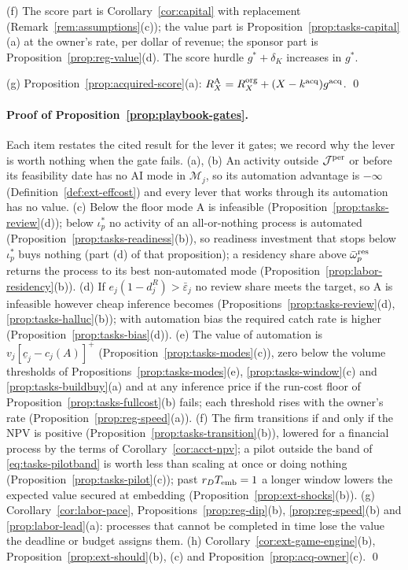 (f) The score part is Corollary~\ref{cor:capital} with replacement (Remark~\ref{rem:assumptions}(c)); the value part is Proposition~\ref{prop:tasks-capital}(a) at the owner's rate, per dollar of revenue; the sponsor part is Proposition~\ref{prop:reg-value}(d). The score hurdle $g^*+\delta_K$ increases in $g^*$.

(g) Proposition~\ref{prop:acquired-score}(a): $R^{\rm A}_X=R^{\rm org}_X+(X-k^{\rm acq})g^{\rm acq}$. \qed

\paragraph{Proof of Proposition~\ref{prop:playbook-gates}.}
Each item restates the cited result for the lever it gates; we record why the lever is worth nothing when the gate fails. (a), (b) An activity outside $\mathcal J^{\rm per}$ or before its feasibility date has no AI mode in $\mathcal M_j$, so its automation advantage is $-\infty$ (Definition~\ref{def:ext-effcost}) and every lever that works through its automation has no value. (c) Below the floor mode A is infeasible (Proposition~\ref{prop:tasks-review}(d)); below $\iota^*_p$ no activity of an all-or-nothing process is automated (Proposition~\ref{prop:tasks-readiness}(b)), so readiness investment that stops below $\iota^*_p$ buys nothing (part (d) of that proposition); a residency share above $\bar\omega^{\rm res}_p$ returns the process to its best non-automated mode (Proposition~\ref{prop:labor-residency}(b)). (d) If $e_j(1-d^R_j)>\bar\varepsilon_j$ no review share meets the target, so A is infeasible however cheap inference becomes (Propositions~\ref{prop:tasks-review}(d), \ref{prop:tasks-halluc}(b)); with automation bias the required catch rate is higher (Proposition~\ref{prop:tasks-bias}(d)). (e) The value of automation is $v_j[\underline c_j-c_j(A)]^+$ (Proposition~\ref{prop:tasks-modes}(c)), zero below the volume thresholds of Propositions~\ref{prop:tasks-modes}(e), \ref{prop:tasks-window}(c) and \ref{prop:tasks-buildbuy}(a) and at any inference price if the run-cost floor of Proposition~\ref{prop:tasks-fullcost}(b) fails; each threshold rises with the owner's rate (Proposition~\ref{prop:reg-speed}(a)). (f) The firm transitions if and only if the NPV is positive (Proposition~\ref{prop:tasks-transition}(b)), lowered for a financial process by the terms of Corollary~\ref{cor:acct-npv}; a pilot outside the band of \eqref{eq:tasks-pilotband} is worth less than scaling at once or doing nothing (Proposition~\ref{prop:tasks-pilot}(c)); past $r_DT_{\rm emb}=1$ a longer window lowers the expected value secured at embedding (Proposition~\ref{prop:ext-shocks}(b)). (g) Corollary~\ref{cor:labor-pace}, Propositions~\ref{prop:reg-dip}(b), \ref{prop:reg-speed}(b) and \ref{prop:labor-lead}(a): processes that cannot be completed in time lose the value the deadline or budget assigns them. (h) Corollary~\ref{cor:ext-game-engine}(b), Proposition~\ref{prop:ext-should}(b), (c) and Proposition~\ref{prop:acq-owner}(c). \qed

